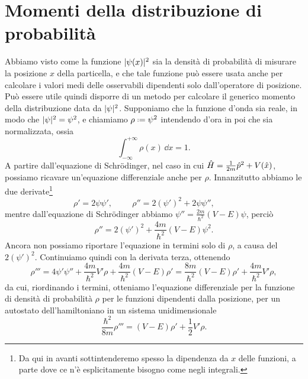 \section{Momenti della distribuzione di probabilità}
Abbiamo visto come la funzione $\lvert\psi(x)\rvert^2$ sia la densità di probabilità di misurare la posizione $x$ della particella, e che tale funzione può essere usata anche per calcolare i valori medi delle osservabili dipendenti solo dall'operatore di posizione.
Può essere utile quindi disporre di un metodo per calcolare il generico momento della distribuzione data da $\lvert\psi\rvert^2$.
Supponiamo che la funzione d'onda sia reale, in modo che $\lvert\psi\rvert^2=\psi^2$, e chiamiamo $\rho\defeq\psi^2$ intendendo d'ora in poi che sia normalizzata, ossia
\begin{equation}
	\int_{-\infty}^{+\infty}\rho(x)\,\dd x=1.
\end{equation}
A partire dall'equazione di Schr\"odinger, nel caso in cui $\hat{H}=\frac1{2m}\hat{p}^2+V(\hat{x})$, possiamo ricavare un'equazione differenziale anche per $\rho$.
Innanzitutto abbiamo le due derivate\footnote{
	Da qui in avanti sottintenderemo spesso la dipendenza da $x$ delle funzioni, a parte dove ce n'è esplicitamente bisogno come negli integrali.
}
\begin{equation}
	\rho'=2\psi\psi',
	\hspace{1cm}
	\rho''=2(\psi')^2+2\psi\psi'',
	\hspace{1cm}
\end{equation}
mentre dall'equazione di Schr\"odinger abbiamo $\psi''=\frac{2m}{\hbar^2}(V-E)\psi$, perciò
\begin{equation}
	\rho''=2(\psi')^2+\frac{4m}{\hbar^2}(V-E)\psi^2.
\end{equation}
Ancora non possiamo riportare l'equazione in termini solo di $\rho$, a causa del $2(\psi')^2$.
Continuiamo quindi con la derivata terza, ottenendo
\begin{equation}
	\rho'''=4\psi'\psi''+\frac{4m}{\hbar^2}V'\rho+\frac{4m}{\hbar^2}(V-E)\rho'=\frac{8m}{\hbar^2}(V-E)\rho'+\frac{4m}{\hbar^2}V'\rho,
\end{equation}
da cui, riordinando i termini, otteniamo l'equazione differenziale per la funzione di densità di probabilità $\rho$ per le funzioni dipendenti dalla posizione, per un autostato dell'hamiltoniano in un sistema unidimensionale
\begin{equation}
	\frac{\hbar^2}{8m}\rho'''=(V-E)\rho'+\frac12V'\rho.
	\label{eq:eq-differenziale-pdf-posizione-unidimensionale}
\end{equation}

